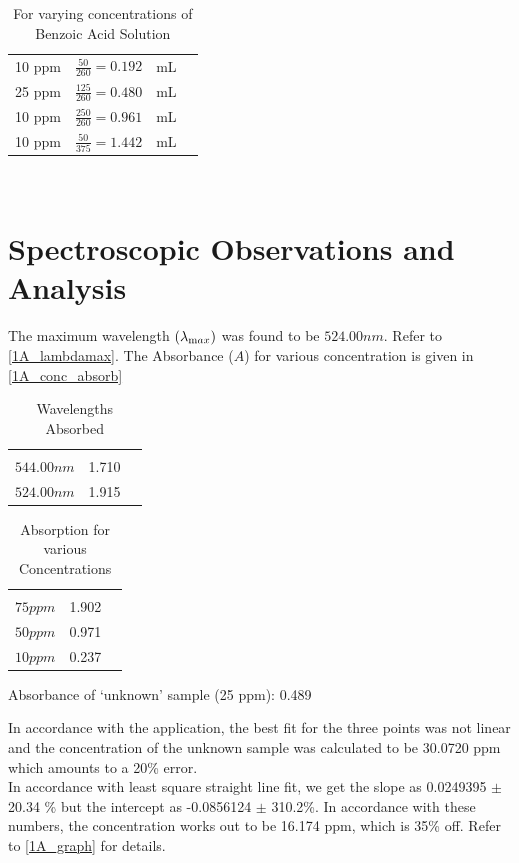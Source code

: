 	\begin{table}
		\myfloatalign
		\begin{tabularx}{\textwidth}{Xlll}
			\hline%
			10 ppm 	&	$\frac{50}{260}=0.192$	&	mL\\
			25 ppm 	&	$\frac{125}{260}=0.480$	&	mL\\
			10 ppm 	&	$\frac{250}{260}=0.961$	&	mL\\
			10 ppm 	&	$\frac{50}{375}=1.442$	&	mL\\ \hline%
		\end{tabularx}\\
		\caption{For varying concentrations of Benzoic Acid Solution}
		\label{1A_vary}
	\end{table}

\section{Spectroscopic Observations and Analysis}
	The maximum wavelength $(\lambda_{\text max})$ was found to be $524.00 nm$. Refer to \autoref{1A_lambdamax}. The Absorbance ($A$) for various concentration is given in \autoref{1A_conc_absorb}
	\begin{table}
		\myfloatalign
		\begin{tabularx}{\textwidth}{Xll}
			\hline
			\tableheadline{Wavelength $(\lambda)$} 	&	\tableheadline{Absorbance}\\
			$544.00 nm$								&	1.710\\
			$524.00 nm$								&	1.915\\		
			\hline
		\end{tabularx}
		\caption{Wavelengths Absorbed}
		\label{1A_lambdamax}
	\end{table}

	\begin{table}
		\myfloatalign
		\begin{tabularx}{\textwidth}{Xll}
			\hline
			\tableheadline{Concentration $(c)$} 	&	\tableheadline{Absorbance}\\
			$75 ppm$								&	1.902\\
			$50 ppm$								&	0.971\\
			$10 ppm$								&	0.237\\
			\hline
		\end{tabularx}
		\caption{Absorption for various Concentrations}
		\label{1A_conc_absorb}
	\end{table}
	Absorbance of `unknown' sample (25 ppm): 0.489
	\par
	In accordance with the application, the best fit for the three points was not linear and the concentration of the unknown sample was calculated to be 30.0720 ppm which amounts to a 20\% error.\\
	In accordance with least square straight line fit, we get the slope as 0.0249395 $\pm$ 20.34 \% but the intercept as -0.0856124 $\pm$ 310.2\%. In accordance with these numbers, the concentration works out to be 16.174 ppm, which is 35\% off. Refer to \autoref{1A_graph} for details.

